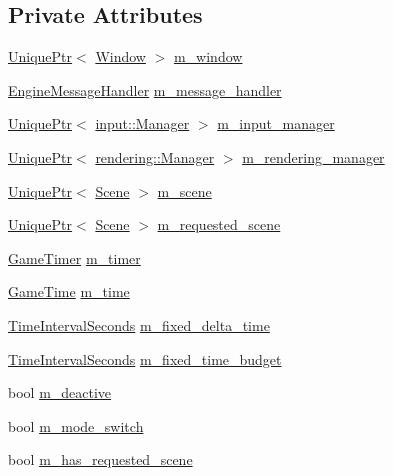 \subsection*{Private Attributes}
\begin{DoxyCompactItemize}
\item 
\mbox{\hyperlink{namespacemage_a3316d7143a973e37adf1110f2e80ca31}{Unique\+Ptr}}$<$ \mbox{\hyperlink{classmage_1_1_window}{Window}} $>$ \mbox{\hyperlink{classmage_1_1_engine_a8b710b9c37a48caad05896102c4b6980}{m\+\_\+window}}
\item 
\mbox{\hyperlink{classmage_1_1_engine_message_handler}{Engine\+Message\+Handler}} \mbox{\hyperlink{classmage_1_1_engine_a8359f22543fa6e39c948411e3023c397}{m\+\_\+message\+\_\+handler}}
\item 
\mbox{\hyperlink{namespacemage_a3316d7143a973e37adf1110f2e80ca31}{Unique\+Ptr}}$<$ \mbox{\hyperlink{classmage_1_1input_1_1_manager}{input\+::\+Manager}} $>$ \mbox{\hyperlink{classmage_1_1_engine_a33db04e6d27802054769ff6a30911261}{m\+\_\+input\+\_\+manager}}
\item 
\mbox{\hyperlink{namespacemage_a3316d7143a973e37adf1110f2e80ca31}{Unique\+Ptr}}$<$ \mbox{\hyperlink{classmage_1_1rendering_1_1_manager}{rendering\+::\+Manager}} $>$ \mbox{\hyperlink{classmage_1_1_engine_ae870ec5b532a21112500f0f0f03e9b55}{m\+\_\+rendering\+\_\+manager}}
\item 
\mbox{\hyperlink{namespacemage_a3316d7143a973e37adf1110f2e80ca31}{Unique\+Ptr}}$<$ \mbox{\hyperlink{classmage_1_1_scene}{Scene}} $>$ \mbox{\hyperlink{classmage_1_1_engine_a2d4037208a0529838c81ccea08c9de11}{m\+\_\+scene}}
\item 
\mbox{\hyperlink{namespacemage_a3316d7143a973e37adf1110f2e80ca31}{Unique\+Ptr}}$<$ \mbox{\hyperlink{classmage_1_1_scene}{Scene}} $>$ \mbox{\hyperlink{classmage_1_1_engine_a45160eecbdcbebcf269436505342db54}{m\+\_\+requested\+\_\+scene}}
\item 
\mbox{\hyperlink{classmage_1_1_game_timer}{Game\+Timer}} \mbox{\hyperlink{classmage_1_1_engine_a360589e71a3d081c6a748aa283d1526d}{m\+\_\+timer}}
\item 
\mbox{\hyperlink{classmage_1_1_game_time}{Game\+Time}} \mbox{\hyperlink{classmage_1_1_engine_ab5f56d65109d276dd49ba43c504bbd26}{m\+\_\+time}}
\item 
\mbox{\hyperlink{namespacemage_a21c3d1575018d1e0720948713c76be1f}{Time\+Interval\+Seconds}} \mbox{\hyperlink{classmage_1_1_engine_a3f7f78eb2dacdf35caed532814fb89e5}{m\+\_\+fixed\+\_\+delta\+\_\+time}}
\item 
\mbox{\hyperlink{namespacemage_a21c3d1575018d1e0720948713c76be1f}{Time\+Interval\+Seconds}} \mbox{\hyperlink{classmage_1_1_engine_ab99fae2c87c8c579d3c1b3af9ba19722}{m\+\_\+fixed\+\_\+time\+\_\+budget}}
\item 
bool \mbox{\hyperlink{classmage_1_1_engine_ab8a4b0157403708ae7d1d018a95b4c63}{m\+\_\+deactive}}
\item 
bool \mbox{\hyperlink{classmage_1_1_engine_aa5cb2e0b7bb2c4a9020e79ab832ee221}{m\+\_\+mode\+\_\+switch}}
\item 
bool \mbox{\hyperlink{classmage_1_1_engine_a96089c745442208679ea2e18cc6a6097}{m\+\_\+has\+\_\+requested\+\_\+scene}}
\end{DoxyCompactItemize}


